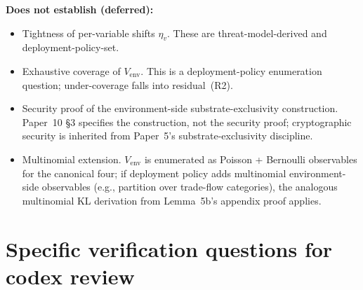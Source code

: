 \documentclass{article}
\begin{document}
\textbf{Does not establish (deferred):}
\begin{itemize}
\item Tightness of per-variable shifts $\eta_v$.  These are
  threat-model-derived and deployment-policy-set.
\item Exhaustive coverage of $V_{\mathrm{env}}$.  This is a
  deployment-policy enumeration question; under-coverage falls into
  residual~(R2).
\item Security proof of the environment-side substrate-exclusivity
  construction.  Paper~10 §3 specifies the construction, not the
  security proof; cryptographic security is inherited from
  Paper~5's substrate-exclusivity discipline.
\item Multinomial extension.  $V_{\mathrm{env}}$ is enumerated as
  Poisson + Bernoulli observables for the canonical four; if
  deployment policy adds multinomial environment-side observables
  (e.g., partition over trade-flow categories), the analogous
  multinomial KL derivation from Lemma~5b's appendix proof applies.
\end{itemize}

\section{Specific verification questions for codex review}
\end{document}
